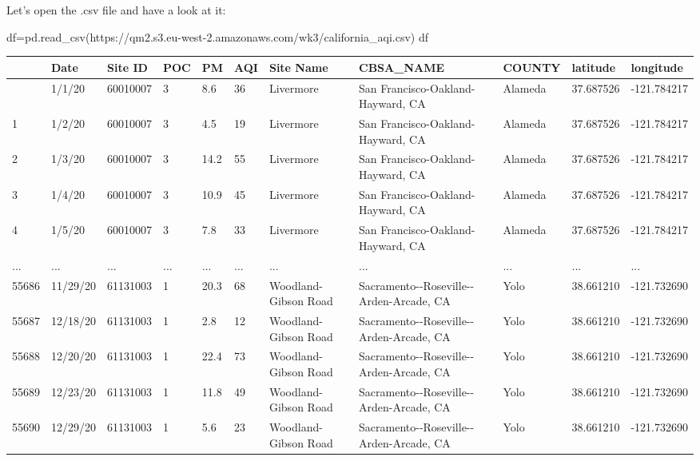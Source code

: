 \documentclass[
  letterpaper,
  DIV=11,
  numbers=noendperiod]{scrreprt}
\newenvironment{Shaded}{\begin{snugshade}}{\end{snugshade}}
\newcommand{\NormalTok}[1]{\textcolor[rgb]{0.00,0.23,0.31}{#1}}
\newcommand{\OperatorTok}[1]{\textcolor[rgb]{0.37,0.37,0.37}{#1}}
\newcommand{\StringTok}[1]{\textcolor[rgb]{0.13,0.47,0.30}{#1}}
\begin{document}
Let's open the .csv file and have a look at it:

\begin{Shaded}
\begin{Highlighting}[]
\NormalTok{df}\OperatorTok{=}\NormalTok{pd.read\_csv(}\StringTok{\textquotesingle{}https://qm2.s3.eu{-}west{-}2.amazonaws.com/wk3/california\_aqi.csv\textquotesingle{}}\NormalTok{)}
\NormalTok{df}
\end{Highlighting}
\end{Shaded}

\begin{longtable}[]{@{}lllllllllll@{}}
\toprule\noalign{}
& Date & Site ID & POC & PM & AQI & Site Name & CBSA\_NAME & COUNTY &
latitude & longitude \\
\midrule\noalign{}
\endhead
\bottomrule\noalign{}
\endlastfoot
0 & 1/1/20 & 60010007 & 3 & 8.6 & 36 & Livermore & San
Francisco-Oakland-Hayward, CA & Alameda & 37.687526 & -121.784217 \\
1 & 1/2/20 & 60010007 & 3 & 4.5 & 19 & Livermore & San
Francisco-Oakland-Hayward, CA & Alameda & 37.687526 & -121.784217 \\
2 & 1/3/20 & 60010007 & 3 & 14.2 & 55 & Livermore & San
Francisco-Oakland-Hayward, CA & Alameda & 37.687526 & -121.784217 \\
3 & 1/4/20 & 60010007 & 3 & 10.9 & 45 & Livermore & San
Francisco-Oakland-Hayward, CA & Alameda & 37.687526 & -121.784217 \\
4 & 1/5/20 & 60010007 & 3 & 7.8 & 33 & Livermore & San
Francisco-Oakland-Hayward, CA & Alameda & 37.687526 & -121.784217 \\
... & ... & ... & ... & ... & ... & ... & ... & ... & ... & ... \\
55686 & 11/29/20 & 61131003 & 1 & 20.3 & 68 & Woodland-Gibson Road &
Sacramento-\/-Roseville-\/-Arden-Arcade, CA & Yolo & 38.661210 &
-121.732690 \\
55687 & 12/18/20 & 61131003 & 1 & 2.8 & 12 & Woodland-Gibson Road &
Sacramento-\/-Roseville-\/-Arden-Arcade, CA & Yolo & 38.661210 &
-121.732690 \\
55688 & 12/20/20 & 61131003 & 1 & 22.4 & 73 & Woodland-Gibson Road &
Sacramento-\/-Roseville-\/-Arden-Arcade, CA & Yolo & 38.661210 &
-121.732690 \\
55689 & 12/23/20 & 61131003 & 1 & 11.8 & 49 & Woodland-Gibson Road &
Sacramento-\/-Roseville-\/-Arden-Arcade, CA & Yolo & 38.661210 &
-121.732690 \\
55690 & 12/29/20 & 61131003 & 1 & 5.6 & 23 & Woodland-Gibson Road &
Sacramento-\/-Roseville-\/-Arden-Arcade, CA & Yolo & 38.661210 &
-121.732690 \\
\end{longtable}
\end{document}

